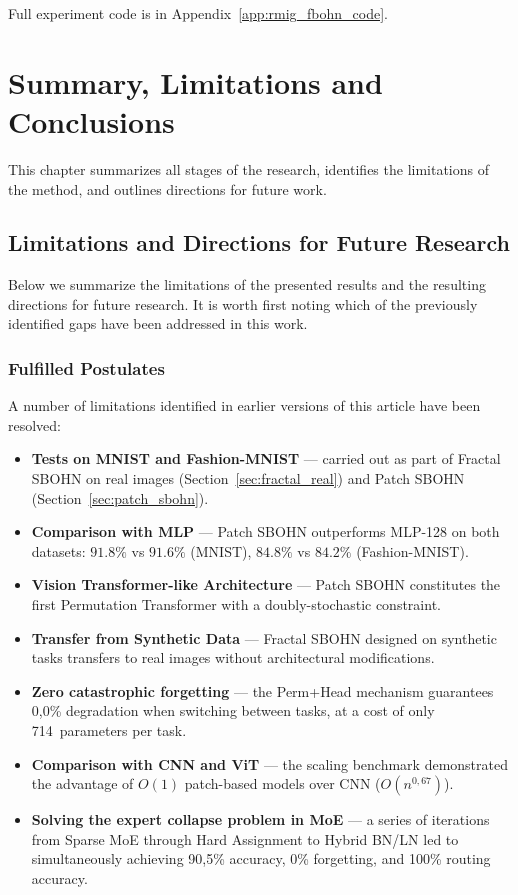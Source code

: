 \documentclass[11pt,a4paper]{report}
\begin{document}
Full experiment code is in Appendix~\ref{app:rmig_fbohn_code}.




\chapter{Summary, Limitations and Conclusions}

This chapter summarizes all stages of the research, identifies the limitations of the method, and outlines directions for future work.

\section{Limitations and Directions for Future Research}

Below we summarize the limitations of the presented results and the resulting directions for future research.
It is worth first noting which of the previously identified gaps have been addressed in this work.

\subsection{Fulfilled Postulates}

A number of limitations identified in earlier versions of this article have been resolved:
\begin{itemize}
\item \textbf{Tests on MNIST and Fashion-MNIST} --- carried out as part of Fractal SBOHN on real images (Section~\ref{sec:fractal_real}) and Patch SBOHN (Section~\ref{sec:patch_sbohn}).
\item \textbf{Comparison with MLP} --- Patch SBOHN outperforms MLP-128 on both datasets: $91.8\%$ vs $91.6\%$ (MNIST), $84.8\%$ vs $84.2\%$ (Fashion-MNIST).
\item \textbf{Vision Transformer-like Architecture} --- Patch SBOHN constitutes the first Permutation Transformer with a doubly-stochastic constraint.
\item \textbf{Transfer from Synthetic Data} --- Fractal SBOHN designed on synthetic tasks transfers to real images without architectural modifications.
\item \textbf{Zero catastrophic forgetting} --- the Perm+Head mechanism guarantees 0{,}0\% degradation when switching between tasks, at a cost of only 714~parameters per task.
\item \textbf{Comparison with CNN and ViT} --- the scaling benchmark demonstrated the advantage of $O(1)$ patch-based models over CNN ($O(n^{0{,}67})$).
\item \textbf{Solving the expert collapse problem in MoE} --- a series of iterations from Sparse MoE through Hard Assignment to Hybrid BN/LN led to simultaneously achieving 90{,}5\% accuracy, 0\% forgetting, and 100\% routing accuracy.
\end{itemize}
\end{document}
